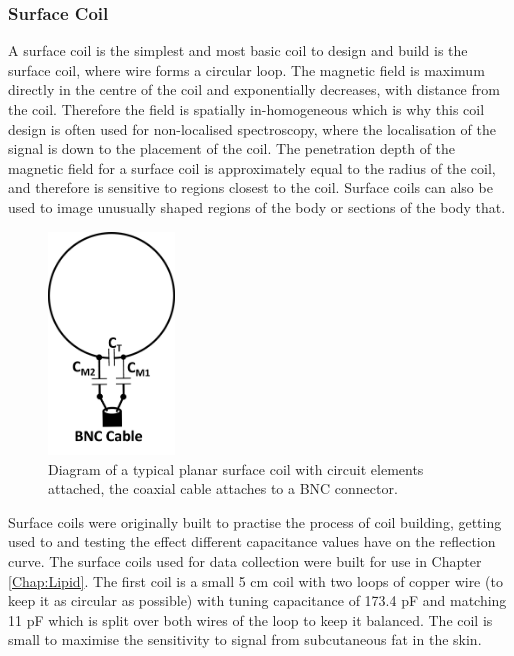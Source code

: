 \documentclass[class=article, crop=false]{standalone}
\begin{document}
\subsubsection{Surface Coil}
\label{Chap:Theory:Coils}

A surface coil is the simplest and most basic coil to design and build is the surface coil, where wire forms a circular loop. The magnetic field is maximum directly in the centre of the coil and exponentially decreases, with distance from the coil. Therefore the field is spatially in-homogeneous which is why this coil design is often used for non-localised spectroscopy, where the localisation of the signal is down to the placement of the coil. The penetration depth of the magnetic field for a surface coil is approximately equal to the radius of the coil, and therefore is sensitive to regions closest to the coil. Surface coils can also be used to image unusually shaped regions of the body or sections of the body that.

\begin{figure}
    \centering
    \includegraphics[width=0.3\textwidth]{Figures/Theory/Surface_Coil.png}
    \caption{Diagram of a typical planar surface coil with circuit elements attached, the coaxial cable attaches to a BNC connector.}
    \label{fig:theory:Surface}
\end{figure}

Surface coils were originally built to practise the process of coil building, getting used to and testing the effect different capacitance values have on the reflection curve. The surface coils used for data collection were built for use in Chapter \ref{Chap:Lipid}. The first coil is a small 5 cm coil with two loops of copper wire (to keep it as circular as possible) with tuning capacitance of 173.4 pF and matching 11 pF which is split over both wires of the loop to keep it balanced. The coil is small to maximise the sensitivity to signal from subcutaneous fat in the skin.
\end{document}
